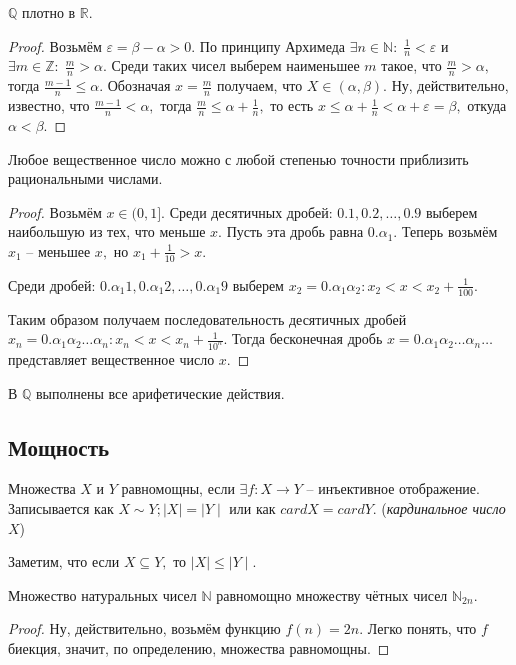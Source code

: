 \begin{Theorem}
$\mathbb{Q}$ плотно в $\mathbb{R}.$
\end{Theorem}
\begin{proof}
Возьмём $\varepsilon = \beta - \alpha > 0.$ По принципу Архимеда $\exists n\in \mathbb{N}: \; \frac{1}{n}<\varepsilon$ и $\exists m\in\mathbb{Z}: \; \frac{m}{n} >\alpha.$ Среди таких чисел выберем наименьшее $m$ такое, что $\frac{m}{n}>\alpha,$ тогда $\frac{m-1}{n}\leq \alpha.$ Обозначая $x=\frac{m}{n}$ получаем, что $X\in(\alpha,\beta).$ Ну, действительно, известно, что $\frac{m-1}{n}<\alpha,$ тогда $\frac{m}{n}\leq\alpha+\frac{1}{n},$ то есть $x\leq \alpha+
\frac{1}{n}<\alpha+\varepsilon=\beta,$ откуда $\alpha < \beta.$
\end{proof}

\begin{Proposition}
Любое вещественное число можно с любой степенью точности приблизить рациональными числами. 
\end{Proposition}
\begin{proof}
Возьмём $x\in(0,1].$ Среди десятичных дробей: $0.1, 0.2,\ldots, 0.9$ выберем наибольшую из тех, что меньше $x.$ Пусть эта дробь равна $0.\alpha_1.$ Теперь возьмём $x_1$ -- меньшее $x,$ но $x_1+\frac{1}{10}>x.$
\smallskip

Среди дробей: $0.\alpha_1 1, 0.\alpha_1 2,\ldots, 0.\alpha_1 9$ выберем $x_2=0.\alpha_1\alpha_2: x_2<x<x_2+\frac{1}{100}.$ 
\smallskip

Таким образом получаем последовательность десятичных дробей $x_n=0.\alpha_1\alpha_2\ldots\alpha_n: x_n<x<x_n+\frac{1}{10^n}.$ Тогда бесконечная дробь $x=0.\alpha_1\alpha_2\ldots\alpha_n\ldots$ представляет вещественное число $x.$
\end{proof}

В $\mathbb{Q}$ выполнены все арифетические действия.
\subsection{Мощность}
\begin{Definition}
Множества $X$ и $Y$ равномощны, если $\exists f:X\rightarrow Y$ -- инъективное отображение. Записывается как $X\sim Y; \mid X\mid=\mid Y\mid$ или как $cardX=cardY.$ (\textit{кардинальное число $X$})
\end{Definition}

Заметим, что если $X\subseteq Y,$ то $\mid X\mid \leq\mid Y\mid.$\\

\begin{Proposition}
Множество натуральных чисел $\mathbb{N}$ равномощно множеству чётных чисел $\mathbb{N}_{2n}.$
\end{Proposition}
\begin{proof}
Ну, действительно, возьмём функцию $f(n)=2n.$ Легко понять, что $f$ биекция, значит, по определению, множества равномощны.
\end{proof}

